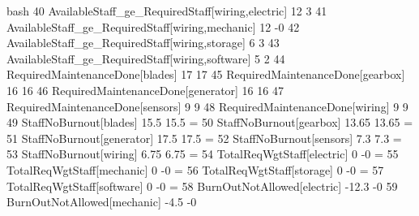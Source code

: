     \begin{boxminted}{bash}
        40 AvailableStaff_ge_RequiredStaff[wiring,electric]
        12             3               
        41 AvailableStaff_ge_RequiredStaff[wiring,mechanic]
                12            -0               
        42 AvailableStaff_ge_RequiredStaff[wiring,storage]
                6             3               
        43 AvailableStaff_ge_RequiredStaff[wiring,software]
                5             2               
        44 RequiredMaintenanceDone[blades]
                17            17               
        45 RequiredMaintenanceDone[gearbox]
                16            16               
        46 RequiredMaintenanceDone[generator]
                16            16               
        47 RequiredMaintenanceDone[sensors]
                9             9               
        48 RequiredMaintenanceDone[wiring]
                9             9               
        49 StaffNoBurnout[blades]
            15.5          15.5             = 
        50 StaffNoBurnout[gearbox]
            13.65         13.65             = 
        51 StaffNoBurnout[generator]
            17.5          17.5             = 
        52 StaffNoBurnout[sensors]
            7.3           7.3             = 
        53 StaffNoBurnout[wiring]
            6.75          6.75             = 
        54 TotalReqWgtStaff[electric]
                0            -0             = 
        55 TotalReqWgtStaff[mechanic]
                0            -0             = 
        56 TotalReqWgtStaff[storage]
                0            -0             = 
        57 TotalReqWgtStaff[software]
                0            -0             = 
        58 BurnOutNotAllowed[electric]
            -12.3                          -0 
        59 BurnOutNotAllowed[mechanic]
            -4.5                          -0 

    \end{boxminted}
    \newpage
    \vspace{2pt}

